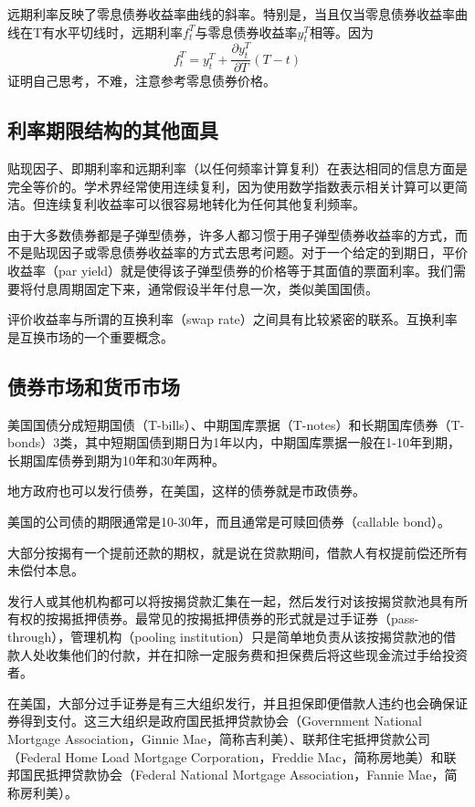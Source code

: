 \documentclass[UTF8]{ctexart}
\begin{document}
远期利率反映了零息债券收益率曲线的斜率。特别是，当且仅当零息债券收益率曲线在T有水平切线时，远期利率$f_t^T$与零息债券收益率$y_t^T$相等。因为$$f_t^T=y_t^T+\frac{\partial y_t^T}{\partial T}(T-t)$$证明自己思考，不难，注意参考零息债券价格。

\subsection{利率期限结构的其他面具}
贴现因子、即期利率和远期利率（以任何频率计算复利）在表达相同的信息方面是完全等价的。学术界经常使用连续复利，因为使用数学指数表示相关计算可以更简洁。但连续复利收益率可以很容易地转化为任何其他复利频率。

由于大多数债券都是子弹型债券，许多人都习惯于用子弹型债券收益率的方式，而不是贴现因子或零息债券收益率的方式去思考问题。对于一个给定的到期日，平价收益率（par yield）就是使得该子弹型债券的价格等于其面值的票面利率。我们需要将付息周期固定下来，通常假设半年付息一次，类似美国国债。

评价收益率与所谓的互换利率（swap rate）之间具有比较紧密的联系。互换利率是互换市场的一个重要概念。

\subsection{债券市场和货币市场}
美国国债分成短期国债（T-bills）、中期国库票据（T-notes）和长期国库债券（T-bonds）3类，其中短期国债到期日为1年以内，中期国库票据一般在1-10年到期，长期国库债券到期为10年和30年两种。

地方政府也可以发行债券，在美国，这样的债券就是市政债券。

美国的公司债的期限通常是10-30年，而且通常是可赎回债券（callable bond）。

大部分按揭有一个提前还款的期权，就是说在贷款期间，借款人有权提前偿还所有未偿付本息。

发行人或其他机构都可以将按揭贷款汇集在一起，然后发行对该按揭贷款池具有所有权的按揭抵押债券。最常见的按揭抵押债券的形式就是过手证券（pass-through），管理机构（pooling institution）只是简单地负责从该按揭贷款池的借款人处收集他们的付款，并在扣除一定服务费和担保费后将这些现金流过手给投资者。

在美国，大部分过手证券是有三大组织发行，并且担保即便借款人违约也会确保证券得到支付。这三大组织是政府国民抵押贷款协会（Government National Mortgage Association，Ginnie Mae，简称吉利美）、联邦住宅抵押贷款公司（Federal Home Load Mortgage Corporation，Freddie Mac，简称房地美）和联邦国民抵押贷款协会（Federal National Mortgage Association，Fannie Mae，简称房利美）。
\end{document}
